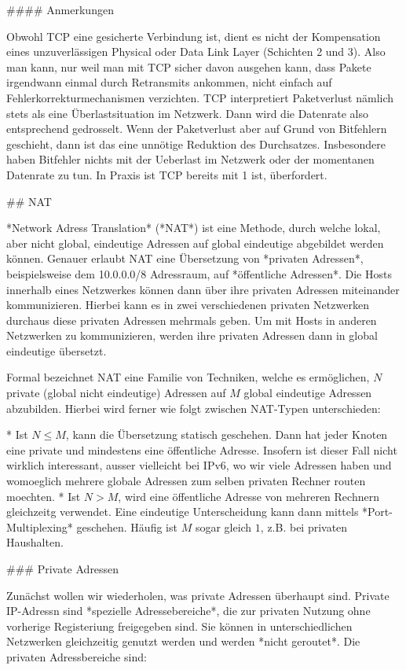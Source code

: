 #### Anmerkungen

Obwohl TCP eine gesicherte Verbindung ist, dient es nicht der Kompensation eines
unzuverlässigen Physical oder Data Link Layer (Schichten 2 und 3). Also man
kann, nur weil man mit TCP sicher davon ausgehen kann, dass Pakete irgendwann
einmal durch Retransmits ankommen, nicht einfach auf Fehlerkorrekturmechanismen
verzichten. TCP interpretiert Paketverlust nämlich stets als eine
Überlastsituation im Netzwerk. Dann wird die Datenrate also entsprechend
gedrosselt. Wenn der Paketverlust aber auf Grund von Bitfehlern geschieht, dann
ist das eine unnötige Reduktion des Durchsatzes. Insbesondere haben Bitfehler
nichts mit der Ueberlast im Netzwerk oder der momentanen Datenrate zu tun. In
Praxis ist TCP bereits mit 1%
ist, überfordert.

## NAT

*Network Adress Translation* (*NAT*) ist eine Methode, durch welche lokal, aber
nicht global, eindeutige Adressen auf global eindeutige abgebildet werden
können. Genauer erlaubt NAT eine Übersetzung von *privaten Adressen*,
beispielsweise dem 10.0.0.0/8 Adressraum, auf *öffentliche Adressen*. Die Hosts
innerhalb eines Netzwerkes können dann über ihre privaten Adressen miteinander
kommunizieren. Hierbei kann es in zwei verschiedenen privaten Netzwerken
durchaus diese privaten Adressen mehrmals geben. Um mit Hosts in anderen
Netzwerken zu kommunizieren, werden ihre privaten Adressen dann in global
eindeutige übersetzt.

Formal bezeichnet NAT eine Familie von Techniken, welche es ermöglichen, $N$
private (global nicht eindeutige) Adressen auf $M$ global eindeutige Adressen
abzubilden. Hierbei wird ferner wie folgt zwischen NAT-Typen unterschieden:

* Ist $N \leq M$, kann die Übersetzung statisch geschehen. Dann hat jeder Knoten
  eine private und mindestens eine öffentliche Adresse. Insofern ist dieser Fall
  nicht wirklich interessant, ausser vielleicht bei IPv6, wo wir viele Adressen
  haben und womoeglich mehrere globale Adressen zum selben privaten Rechner
  routen moechten.
* Ist $N > M$, wird eine öffentliche Adresse von mehreren Rechnern gleichzeitg
  verwendet. Eine eindeutige Unterscheidung kann dann mittels
  *Port-Multiplexing* geschehen. Häufig ist $M$ sogar gleich $1$, z.B. bei
  privaten Haushalten.

### Private Adressen

Zunächst wollen wir wiederholen, was private Adressen überhaupt sind. Private
IP-Adressn sind *spezielle Adressebereiche*, die zur privaten Nutzung ohne
vorherige Registeriung freigegeben sind. Sie können in unterschiedlichen
Netzwerken gleichzeitig genutzt werden und werden *nicht geroutet*. Die privaten
Adressbereiche sind:

